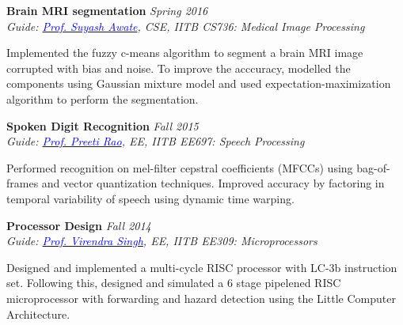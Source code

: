 \documentclass[margin,line,hidelinks]{res}
\newenvironment{list1}{
  \begin{list}{\ding{113}}{%
      \setlength{\itemsep}{0in}
      \setlength{\parsep}{0in} \setlength{\parskip}{0in}
      \setlength{\topsep}{0in} \setlength{\partopsep}{0in} 
      \setlength{\leftmargin}{0.17in}}}{\end{list}}
\begin{document}
\begin{resume}
\vspace*{-0.1in}

{\bf Brain MRI segmentation} \hfill \textit{Spring 2016} \\
{\em Guide: \href{https://www.cse.iitb.ac.in/~suyash}{\textcolor{blue}{Prof. Suyash Awate}}, CSE, IITB \hfill CS736: Medical Image Processing} \\
\vspace*{-.15in}
\begin{list1}
\item[] Implemented the fuzzy c-means algorithm to segment a brain MRI image
corrupted with bias and noise. To improve the acccuracy, modelled the components using Gaussian mixture model and used expectation-maximization algorithm to perform the segmentation.
\end{list1}

\vspace*{-0.1in}


{\bf Spoken Digit Recognition} \hfill \textit{Fall 2015} 
\\
{\em Guide: \href{https://www.ee.iitb.ac.in/wiki/faculty/prao}{\textcolor{blue}{Prof. Preeti Rao}}, EE, IITB \hfill EE697: Speech Processing} \\
\vspace*{-.15in}
\begin{list1}
\item[] Performed recognition on mel-filter cepstral coefficients (MFCCs) using bag-of-frames and vector quantization techniques. Improved accuracy by factoring in temporal variability of speech using dynamic time warping.
\end{list1}


\vspace*{-0.1in}

{\bf Processor Design} \hfill \textit{Fall 2014} \\
{\em Guide: \href{https://www.ee.iitb.ac.in/~viren/}{\textcolor{blue}{Prof. Virendra Singh}}, EE, IITB \hfill EE309: Microprocessors} \\
\vspace*{-.15in}
\begin{list1}
\item[] Designed and implemented a multi-cycle RISC processor with LC-3b instruction set. Following this, designed and simulated a 6 stage pipelened RISC microprocessor with forwarding and hazard detection using the Little Computer Architecture.
\end{list1}


\end{resume}
\end{document}
